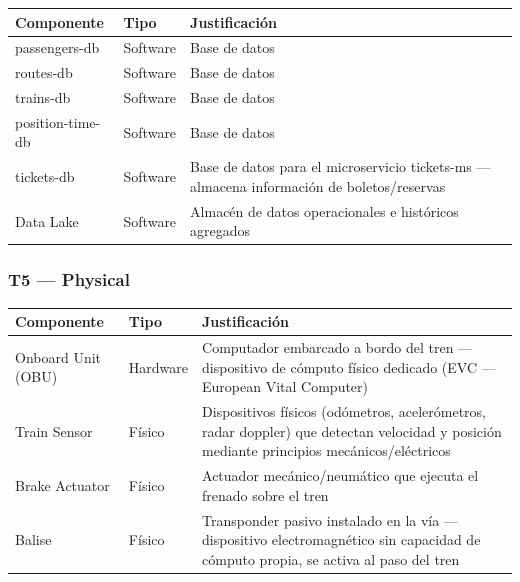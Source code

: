 \documentclass[a4paper, 10 pt]{article}
\begin{document}
\begin{table}[H]
\centering
\footnotesize
\begin{tabular}{|R{0.15\textwidth}|M{0.1\textwidth}|R{0.55\textwidth}|}
\hline
\textbf{Componente} & \textbf{Tipo} & \textbf{Justificación} \\
\hline
passengers-db & Software & Base de datos \\
\hline
routes-db & Software & Base de datos \\
\hline
trains-db & Software & Base de datos \\
\hline
position-time-db & Software & Base de datos \\
\hline
tickets-db & Software & Base de datos para el microservicio tickets-ms --- almacena información de boletos/reservas \\
\hline
Data Lake & Software & Almacén de datos operacionales e históricos agregados \\
\hline
\end{tabular}
\end{table}

\subsubsection{T5 --- Physical}

\begin{table}[H]
\centering
\footnotesize
\begin{tabular}{|R{0.15\textwidth}|M{0.1\textwidth}|R{0.55\textwidth}|}
\hline
\textbf{Componente} & \textbf{Tipo} & \textbf{Justificación} \\
\hline
Onboard Unit (OBU) & Hardware & Computador embarcado a bordo del tren --- dispositivo de cómputo físico dedicado (EVC --- European Vital Computer) \\
\hline
Train Sensor & Físico & Dispositivos físicos (odómetros, acelerómetros, radar doppler) que detectan velocidad y posición mediante principios mecánicos/eléctricos \\
\hline
Brake Actuator & Físico & Actuador mecánico/neumático que ejecuta el frenado sobre el tren \\
\hline
Balise & Físico & Transponder pasivo instalado en la vía --- dispositivo electromagnético sin capacidad de cómputo propia, se activa al paso del tren \\
\hline
\end{tabular}
\end{table}

\end{document}
